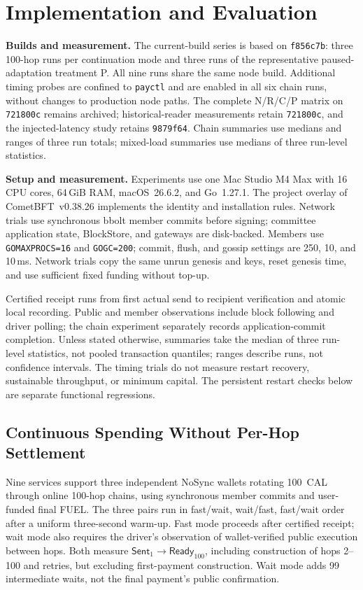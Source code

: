 \section{Implementation and Evaluation}
\label{sec:evaluation}

\noindent\textbf{Builds and measurement.}
The current-build series is based on \texttt{f856c7b}: three
100-hop runs per continuation mode and three runs of the
representative paused-adaptation treatment P. All nine runs
share the same node build. Additional timing probes are confined
to \texttt{payctl} and are enabled in all six chain runs, without
changes to production node paths. The complete N/R/C/P matrix
on \texttt{721800c} remains archived; historical-reader measurements
retain \texttt{721800c}, and the injected-latency study retains
\texttt{9879f64}. Chain summaries use medians and ranges of three
run totals; mixed-load summaries use medians of three run-level
statistics.

\noindent\textbf{Setup and measurement.}
Experiments use one Mac Studio M4 Max with 16 CPU cores, 64\,GiB RAM,
macOS~26.6.2, and Go~1.27.1. The project overlay of CometBFT~v0.38.26
implements the identity and installation rules. Network trials use
synchronous bbolt member commits before signing; committee application
state, BlockStore, and gateways are disk-backed. Members use
\texttt{GOMAXPROCS=16} and \texttt{GOGC=200}; commit, flush, and gossip
settings are 250, 10, and 10\,ms. Network trials copy the same unrun genesis and keys, reset genesis time,
and use sufficient fixed funding without top-up.

Certified receipt runs from first actual send to recipient verification
and atomic local recording. Public and member observations include
block following and driver polling; the chain experiment separately records
application-commit completion. Unless stated otherwise, summaries take
the median of three run-level statistics, not pooled transaction
quantiles; ranges describe runs, not confidence intervals. The timing trials do not measure restart recovery, sustainable
throughput, or minimum capital. The persistent restart checks below
are separate functional regressions.


\subsection{Continuous Spending Without Per-Hop Settlement}
\label{sec:eval-continuation}

Nine services support three independent NoSync wallets rotating 100~CAL through online
100-hop chains, using synchronous member commits and user-funded
final FUEL. The three pairs run in fast/wait, wait/fast, fast/wait order after a uniform three-second warm-up. Fast mode proceeds after certified receipt; wait mode
also requires the driver's observation of wallet-verified public
execution between hops. Both measure
$\mathsf{Sent}_1 \rightarrow \mathsf{Ready}_{100}$, including
construction of hops 2--100 and retries, but excluding first-payment
construction. Wait mode adds 99 intermediate
waits, not the final payment's public confirmation.

